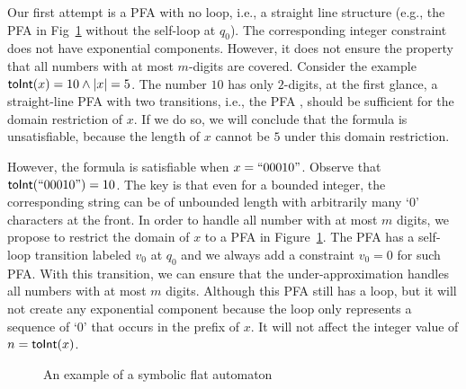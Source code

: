 \documentclass[sigplan,review,anonymous]{acmart}\settopmatter{printfolios=true,printccs=false,printacmref=false}
\begin{document}
Our first attempt is a PFA with no loop, i.e., a straight line structure (e.g., the PFA in Fig~\ref{fig:sfa_its} without the self-loop at $q_0$). The corresponding integer constraint does not have exponential components. However, it does not ensure the property that all numbers with at most $m$-digits are covered. Consider the example $\mbox{\textsf{toInt}($x$)}=10 \wedge |x|=5$. The number $10$ has only $2$-digits, at the first glance, a straight-line PFA with two transitions, i.e., the PFA , should be sufficient for the domain restriction of $x$. If we do so, we will conclude that the formula is unsatisfiable, because the length of $x$ cannot be $5$  under this domain restriction.

However, the formula is satisfiable when $x=``00010"$. Observe that $\mbox{\textsf{toInt}($``00010"$)}=10$. The key is that even for a bounded integer, the corresponding string can be of unbounded length with arbitrarily many `$0$' characters at the front. In order to handle all number with at most $m$ digits, we propose to restrict the domain of $x$ to a PFA in Figure~\ref{fig:sfa_its}.  The PFA has a self-loop transition labeled $v_0$ at $q_0$ and we always add a constraint $v_0=0$ for such PFA. With this transition, we can ensure that the under-approximation handles all numbers with at most $m$ digits. Although this PFA still has a loop, but it will not create any exponential component because the loop only represents a sequence of `0' that occurs in the prefix of $x$. It will not affect the integer value of $n=\mbox{\textsf{toInt}($x$)}$.

\begin{figure}
	
	\caption{An example of a symbolic flat automaton}
	\label{fig:sfa_its}
\end{figure}
\end{document}
